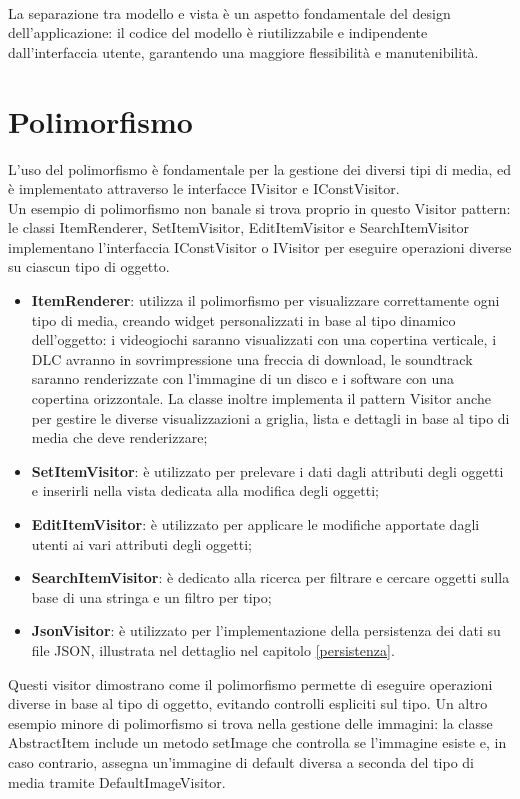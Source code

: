 \documentclass[10pt]{article}
\begin{document}
\\La separazione tra modello e vista è un aspetto fondamentale del design dell'applicazione: il codice del modello è riutilizzabile e indipendente dall'interfaccia utente, garantendo una maggiore flessibilità e manutenibilità.

\section{Polimorfismo}
L'uso del polimorfismo è fondamentale per la gestione dei diversi tipi di media, ed è implementato attraverso le interfacce IVisitor e IConstVisitor.
\\Un esempio di polimorfismo non banale si trova proprio in questo Visitor pattern: le classi ItemRenderer, SetItemVisitor, EditItemVisitor e SearchItemVisitor implementano l'interfaccia IConstVisitor o IVisitor per eseguire operazioni diverse su ciascun tipo di oggetto.
\begin{itemize}
    \item \textbf{ItemRenderer}: utilizza il polimorfismo per visualizzare correttamente ogni tipo di media, creando widget personalizzati in base al tipo dinamico dell'oggetto: i videogiochi saranno visualizzati con una copertina verticale, i DLC avranno in sovrimpressione una freccia di download, le soundtrack saranno renderizzate con l'immagine di un disco e i software con una copertina orizzontale. La classe inoltre implementa il pattern Visitor anche per gestire le diverse visualizzazioni a griglia, lista e dettagli in base al tipo di media che deve renderizzare;
    \item \textbf{SetItemVisitor}: è utilizzato per prelevare i dati dagli attributi degli oggetti e inserirli nella vista dedicata alla modifica degli oggetti;
    \item \textbf{EditItemVisitor}: è utilizzato per applicare le modifiche apportate dagli utenti ai vari attributi degli oggetti;
    \item \textbf{SearchItemVisitor}: è dedicato alla ricerca per filtrare e cercare oggetti sulla base di una stringa e un filtro per tipo;
    \item \textbf{JsonVisitor}: è utilizzato per l'implementazione della persistenza dei dati su file JSON, illustrata nel dettaglio nel capitolo \ref{persistenza}.
\end{itemize}
Questi visitor dimostrano come il polimorfismo permette di eseguire operazioni diverse in base al tipo di oggetto, evitando controlli espliciti sul tipo. Un altro esempio minore di polimorfismo si trova nella gestione delle immagini: la classe AbstractItem include un metodo setImage che controlla se l'immagine esiste e, in caso contrario, assegna un'immagine di default diversa a seconda del tipo di media tramite DefaultImageVisitor.
\end{document}
